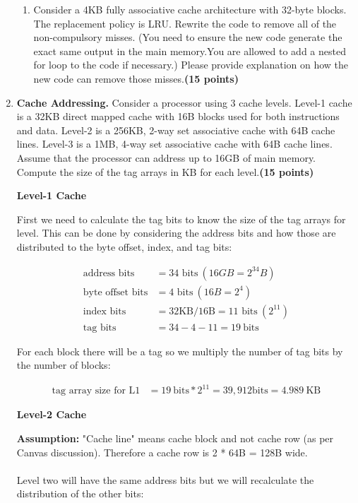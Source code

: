\documentclass[a4paper, 11pt]{exam}
\begin{document}
\begin{enumerate}
\begin{enumerate}
\item Consider a 4KB fully associative cache architecture with 32-byte blocks. The replacement policy is LRU. Rewrite the code to remove  all of the non-compulsory misses. (You need to ensure the new code generate the exact same output in the main memory.You are allowed to add a nested for loop to the code if necessary.) Please provide explanation on how the new code can remove those misses.\textbf{(15 points)}


\end{enumerate}



\item \textbf {Cache Addressing.} Consider a processor using 3 cache levels. Level-1 cache is a
32KB direct mapped cache with 16B blocks used for both instructions and data. Level-2 is a
256KB, 2-way set associative cache with 64B cache lines. Level-3 is a
1MB, 4-way set associative cache with 64B cache lines. Assume that the processor can
address up to 16GB of main memory.  Compute the size of the tag arrays in KB for each level.\textbf{(15 points)}


\textbf{Level-1 Cache}

First we need to calculate the tag bits to know the size of the tag arrays for level. This can be done by considering the address bits and how those are distributed to the byte offset, index, and tag bits:

\begin{align*}
\text{address bits} &= \text{34 bits} \  (16GB = 2^{34} B) \\
\text{byte offset bits} &= \text{4 bits} \ (16B = 2^4) \\
\text{index bits} &= \text{32KB/16B} = \text{11 bits} \ (2^{11})\\
\text{tag bits} &= 34 - 4 - 11 = 19 \ \text{bits}         
\end{align*}

For each block there will be a tag so we multiply the number of tag bits by the number of blocks:

\begin{align*}
\text{tag array size for L1} &= 19 \ \text{bits} * 2^{11} = 39, 912 \text{bits} = 4.989 \ \text{KB} 	
\end{align*}

\textbf{Level-2 Cache}

\textbf{Assumption:} "Cache line" means cache block and not cache row (as per Canvas discussion). Therefore a cache row is 2 * 64B = 128B wide.\\ \\
Level two will have the same address bits but we will recalculate the distribution of the other bits:


\end{enumerate}
\end{document}
